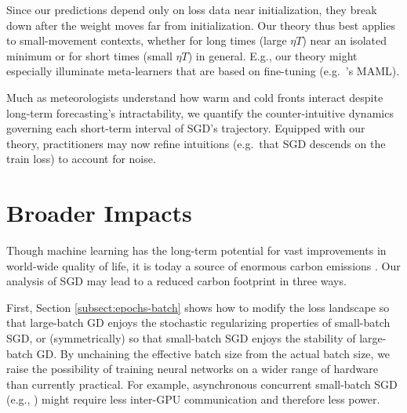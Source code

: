 \documentclass{article}
\theoremstyle{plain}
\theoremstyle{definition}
\begin{document}


        Since our predictions depend only on loss data near initialization,
        they break down after the weight moves far from initialization.  Our
        theory thus best applies to small-movement contexts, whether for long
        times (large $\eta T$) near an isolated minimum or for short times
        (small $\eta T$) in general.  E.g., our theory might especially
        illuminate meta-learners that are based on fine-tuning (e.g.\
        \cite{fi17}'s MAML).

        Much as meteorologists understand how warm and cold fronts interact
        despite long-term forecasting's intractability, we quantify the
        counter-intuitive dynamics governing each short-term interval of SGD's
        trajectory.  Equipped with our theory, practitioners may now
        refine intuitions (e.g.\ that SGD descends on the train loss) to
        account for noise.
       


\section*{Broader Impacts}

    Though machine learning has the long-term potential for vast improvements
    in world-wide quality of life, it is today a source of enormous carbon
    emissions \citep{st19}.  Our analysis of SGD may lead to a reduced carbon
    footprint in three ways. 
     
    First, Section \ref{subsect:epochs-batch} shows how to modify the loss
    landscape so that large-batch GD enjoys the stochastic regularizing
    properties of small-batch SGD, or (symmetrically) so that small-batch SGD
    enjoys the stability of large-batch GD.  By unchaining the effective batch
    size from the actual batch size, we raise the possibility of training
    neural networks on a wider range of hardware than currently practical.  For
    example, asynchronous concurrent small-batch SGD (e.g., \cite{ni11}) might
    require less inter-GPU communication and therefore less power.
     
\end{document}

